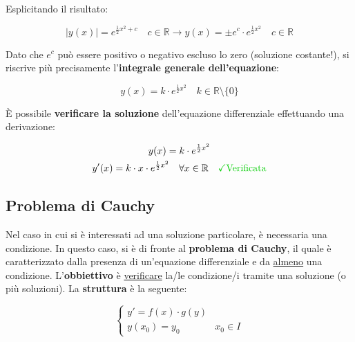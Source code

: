 \documentclass[a4paper]{article}
\begin{document}
	\noindent
	Esplicitando il risultato:
	
	\begin{equation*}
		|y(x)| = e^{\frac{1}{2} x^2 + c} \hspace{1em} c\in\mathbb{R} \longrightarrow y(x) = \pm e^{c} \cdot e^{\frac{1}{2} x^2} \hspace{1em} c \in \mathbb{R}
	\end{equation*}

	Dato che $e^c$ può essere positivo o negativo escluso lo zero (soluzione costante!), si riscrive più precisamente l'\textbf{integrale generale dell'equazione}:
	
	\begin{equation*}
		y(x) = k \cdot e^{\frac{1}{2} x^2} \hspace{1em} k \in \mathbb{R} \setminus \{0\}
	\end{equation*}

	È possibile \textbf{verificare la soluzione} dell'equazione differenziale effettuando una derivazione:
	
	\begin{gather*}
		y(x) = k \cdot e^{\frac{1}{2} x^2} \\
		y'(x) = k \cdot x \cdot e^{\frac{1}{2} x^2} \hspace{1em} \forall x \in \mathbb{R} \hspace{1em} \text{\textcolor{Green3}{\checkmark Verificata}}
	\end{gather*}
	
	\newpage
	
	\subsection{Problema di Cauchy}
	
	Nel caso in cui si è interessati ad una soluzione particolare, è necessaria una condizione. In questo caso, si è di fronte al \textcolor{Red3}{\textbf{problema di Cauchy}}, il quale è caratterizzato dalla presenza di un'equazione differenziale e da \underline{almeno} una condizione.\newline
	L'\textbf{obbiettivo} è \underline{verificare} la/le condizione/i tramite una soluzione (o più soluzioni).\newline
	La \textbf{struttura} è la seguente:
	
	\begin{equation}\label{problema_di_Cauchy}
		\begin{cases}
			y'= f(x) \cdot g(y) \\
			y(x_0) = y_0 & x_0 \in I
		\end{cases}
	\end{equation}
\end{document}
